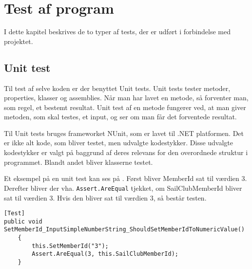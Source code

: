\chapter{Test af program}\label{test_af_program}
I dette kapitel beskrives de to typer af tests, der er udført i forbindelse med projektet. 

\section{Unit test}
Til test af selve koden er der benyttet Unit tests.
Unit tests tester metoder, properties, klasser og assemblies. 
Når man har lavet en metode, så forventer man, som regel, et bestemt resultat. 
Unit test af en metode fungerer ved, at man giver metoden, som skal testes, et input, og ser om man får det forventede resultat.

Til Unit tests bruges frameworket NUnit, som er lavet til .NET platformen. 
Det er ikke alt kode, som bliver testet, men udvalgte kodestykker.
Disse udvalgte kodestykker er valgt på baggrund af deres relevans for den overordnede struktur i programmet. 
Blandt andet bliver klasserne testet. 

Et eksempel på en unit test kan ses på .
Først bliver MemberId sat til værdien 3. 
Derefter bliver der vha. \texttt{Assert.AreEqual} tjekket, om SailClubMemberId bliver sat til værdien 3.
Hvis den bliver sat til værdien 3, så består testen.

\begin{lstlisting}[frame=single, caption=Eksempel på Unit test, label=unit_test]
[Test]
public void SetMemberId_InputSimpleNumberString_ShouldSetMemberIdToNumericValue()
	{
		this.SetMemberId("3");
		Assert.AreEqual(3, this.SailClubMemberId);
	}
\end{lstlisting}

